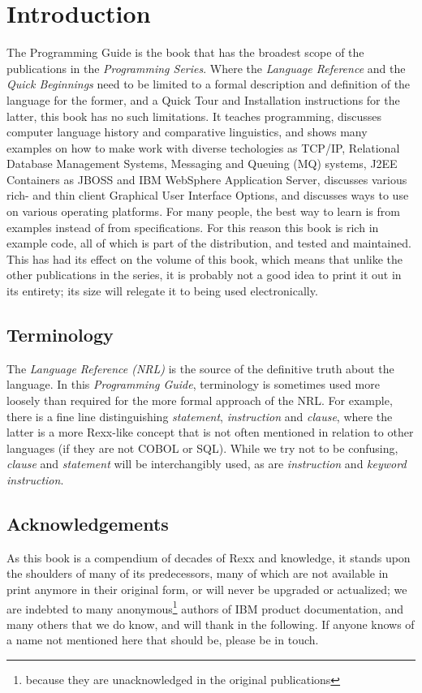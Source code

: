 \chapter{Introduction}
The Programming Guide is the book that has the broadest scope of the publications in the \emph{\nr{} Programming Series}. Where the \emph{Language Reference} and the \emph{Quick Beginnings} need to be limited to a formal description and definition of the \nr{} language for the former, and a Quick Tour and Installation instructions for the latter, this book has no such limitations. It teaches programming, discusses computer language history and comparative linguistics, and shows many examples on how to make \nr{} work with diverse techologies as TCP/IP, Relational Database Management Systems, Messaging and Queuing (MQ\textsuperscript{\texttrademark}) systems, J2EE Containers as JBOSS\textsuperscript{\texttrademark} and IBM WebSphere Application Server\textsuperscript{\texttrademark}, discusses various rich- and thin client Graphical User Interface Options, and discusses ways to use \nr{} on various operating platforms. For many people, the best way to learn is from examples instead of from specifications. For this reason this book is rich in example code, all of which is part of the \nr{} distribution, and tested and maintained. This has had its effect on the volume of this book, which means that unlike the other publications in the series, it is probably not a good idea to print it out in its entirety; its size will relegate it to being used electronically.
\section*{Terminology}
The \emph{\nr{} Language Reference (NRL)} is the source of the definitive truth about the language. In this \emph{Programming Guide}, terminology is sometimes used more loosely than required for the more formal approach of the NRL. For example, there is a fine line distinguishing \emph{statement}, \emph{instruction} and \emph{clause}, where the latter is a more Rexx-like concept that is not often mentioned in relation to other languages (if they are not COBOL or SQL). While we try not to be confusing, \emph{clause} and \emph{statement} will be interchangibly used, as are \emph{instruction} and \emph{keyword instruction}.
\section*{Acknowledgements}
As this book is a compendium of decades of Rexx and \nr{} knowledge, it stands upon the shoulders of many of its predecessors, many of which are not available in print anymore in their original form, or will never be upgraded or actualized; we are indebted to many anonymous\footnote{because they are unacknowledged in the original publications} authors of IBM product documentation, and many others that we do know, and will thank in the following. If anyone knows of a name not mentioned here that should be, please be in touch. 


